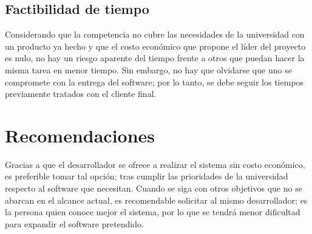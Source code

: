 \subsection{Factibilidad de tiempo}
\normalsize{ \indent
Considerando que la competencia no cubre las necesidades
de la universidad con un producto ya hecho y que el costo
econ\'omico que propone el l\'ider del proyecto es nulo, no
hay un riesgo aparente del tiempo frente a otros que puedan
hacer la misma tarea en menor tiempo. Sin embargo, no hay que
olvidarse que uno se compromete con la entrega del software;
por lo tanto, se debe seguir los tiempos previamente tratados
con el cliente final.
}
\section{Recomendaciones}
\normalsize{ \indent
Gracias a que el desarrollador se ofrece a realizar el sistema
sin costo econ\'omico, es preferible tomar tal opci\'on; tras
cumplir las prioridades de la universidad respecto al
software que necesitan.
}
\newline
\normalsize{ \indent
Cuando se siga con otros objetivos que no se abarcan en el
alcance actual, es recomendable solicitar al mismo desarrollador;
es la persona quien conoce mejor el sistema, por lo que se
tendr\'a menor dificultad para expandir el software pretendido.
}
